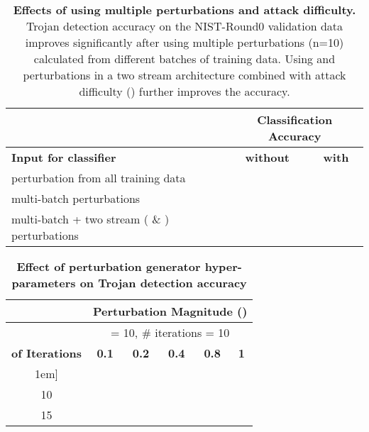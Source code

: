 \documentclass{article}
\begin{document}
\begin{table}[h!]
\caption{\textbf{Effects of using multiple perturbations and attack difficulty.} Trojan detection accuracy on the NIST-Round0 validation data improves significantly after using multiple perturbations (n=10) calculated from different batches of training data. Using  and  perturbations in a two stream architecture combined with attack difficulty () further improves the accuracy.}
\begin{center}
\label{tab:tro_det}
\begin{tabular}{|l|c|c|}
\hline
 & \multicolumn{2}{c|}{\textbf{Classification Accuracy}} \\ 
\hline
\textbf{Input for classifier} & \textbf{without }  & \textbf{with } \\
 \hline
 \hline 
 perturbation from all training data &   &  \\ \hline
multi-batch  perturbations                             &  &   \\ \hline
 multi-batch + two stream ( \& ) perturbations  &  &   \\ \hline

\end{tabular}
\end{center}
\end{table}

\begin{table}[h!]
\caption{\textbf{Effect of perturbation generator hyper-parameters on Trojan detection accuracy}
}
\begin{center}
\label{tab:comap_hyper}
\begin{tabular}{|c|c|c|c|c|c|}
\hline
 & \multicolumn{5}{c|}{\rule{0pt}{1.2em}\textbf{  Perturbation Magnitude ()}} \\ \hline
 & \multicolumn{5}{c|}{\rule{0pt}{1.2em} = 10, \#  iterations = 10} \\ \hline
\textbf{ of Iterations} &\textbf{0.1} & \textbf{0.2}  & \textbf{0.4} & \textbf{0.8}  & \textbf{1}  \\ \hline
\-1em] \hline
  5 &  &   &  &  &  \\ \hline
 10 &  &   &  &  &  \\ \hline
 15 &  &   &  &  &  \\ \hline
\end{tabular}
\end{center}
\end{table}
\end{document}
